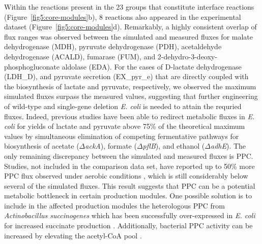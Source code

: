 Within the reactions present in the 23 groups that constitute interface reactions (Figure~\ref{fig5:core-modules}b), 8 reactions also appeared in the experimental dataset (Figure~\ref{fig5:core-modules}d).
Remarkably, a highly consistent overlap of flux ranges was observed between the simulated and measured fluxes for malate dehydrogenase (MDH), pyruvate dehydrogenase (PDH), acetaldehyde dehydrogenase (ACALD), fumarase (FUM), and 2-dehydro-3-deoxy-phosphogluconate aldolase (EDA).
For the cases of  D-lactate dehydrogenase (LDH\_D), and pyruvate secretion (EX\_pyr\_e) that are directly coupled with the biosynthesis of lactate and pyruvate, respectively, we observed the maximum simulated fluxes surpass the measured values, suggesting that further engineering of wild-type and single-gene deletion \textit{E. coli} is needed to attain the requried fluxes.
Indeed, previous studies\citep{zhou2003, causey2004} have been able to redirect metabolic fluxes in \textit{E. coli} for yields of lactate and pyruvate above 75\% of the theoretical maximum values by simultaneous elimination of competing fermentative pathways for biosynthesis of acetate ($\Delta$\textit{ackA}), formate ($\Delta$\textit{pflB}), and ethanol ($\Delta$\textit{adhE}).
The only remaining discrepancy between the simulated and measured fluxes is PPC.
Studies, not included in the comparison data set, have reported up to 50\% more PPC flux observed under aerobic conditions \citep{peng2004, siddiquee2004}, which is still considerably below several of the simulated fluxes.
This result suggests that PPC can be a potential metabolic bottleneck in certain production modules. One possible solution is to include in the affected production modules the heterologous PPC from \textit{Actinobacillus succinogenes} which has been successfully over-expressed in \textit{E. coli} for increased succinate production \citep{kim2004}.
Additionally, bacterial PPC activity can be increased by elevating the acetyl-CoA pool \citep{lin2004}.



